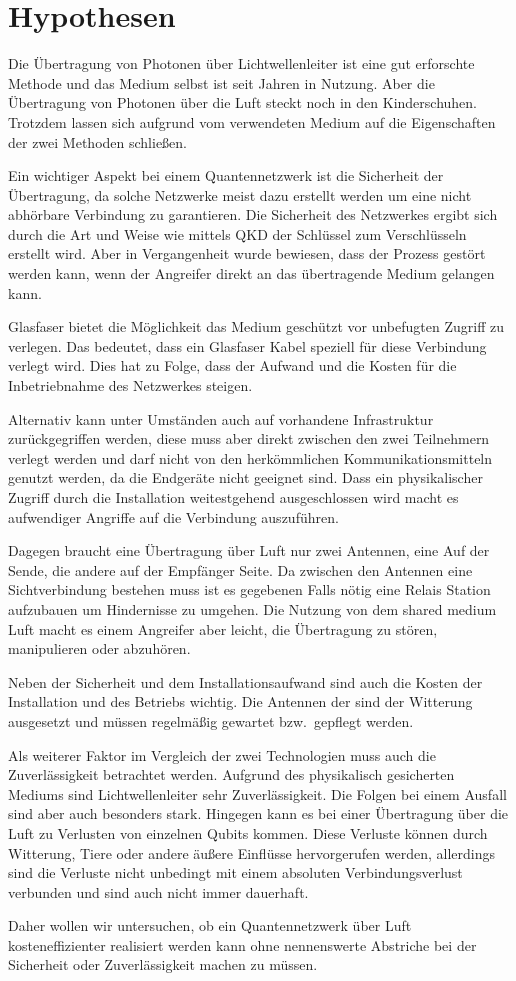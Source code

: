 \chapter{Hypothesen}

Die Übertragung von Photonen über Lichtwellenleiter ist eine gut erforschte Methode und das Medium selbst ist seit Jahren in Nutzung.
Aber die Übertragung von Photonen über die Luft steckt noch in den Kinderschuhen.
Trotzdem lassen sich aufgrund vom verwendeten Medium auf die Eigenschaften der zwei Methoden schließen.

Ein wichtiger Aspekt bei einem Quantennetzwerk ist die Sicherheit der Übertragung, da solche Netzwerke meist dazu erstellt werden um eine nicht abhörbare Verbindung zu garantieren.
Die Sicherheit des Netzwerkes ergibt sich durch die Art und Weise wie mittels \ac{QKD} der Schlüssel zum Verschlüsseln erstellt wird.
Aber in Vergangenheit wurde bewiesen, dass der Prozess gestört werden kann, wenn der Angreifer direkt an das übertragende Medium gelangen kann\cite{Fei2018QuantumMA}.

Glasfaser bietet die Möglichkeit das Medium geschützt vor unbefugten Zugriff zu verlegen.
Das bedeutet, dass ein Glasfaser Kabel speziell für diese Verbindung verlegt wird.
Dies hat zu Folge, dass der Aufwand und die Kosten für die Inbetriebnahme des Netzwerkes steigen.

Alternativ kann unter Umständen auch auf vorhandene Infrastruktur zurückgegriffen werden, diese muss aber direkt zwischen den zwei Teilnehmern verlegt werden und darf nicht von den herkömmlichen Kommunikationsmitteln genutzt werden, da die Endgeräte nicht geeignet sind.
Dass ein physikalischer Zugriff durch die Installation weitestgehend ausgeschlossen wird macht es aufwendiger Angriffe auf die Verbindung auszuführen.

Dagegen braucht eine Übertragung über Luft nur zwei Antennen, eine Auf der Sende, die andere auf der Empfänger Seite.
Da zwischen den Antennen eine Sichtverbindung bestehen muss ist es gegebenen Falls nötig eine Relais Station aufzubauen um Hindernisse zu umgehen.
Die Nutzung von dem shared medium Luft macht es einem Angreifer aber leicht, die Übertragung zu stören, manipulieren oder abzuhören.

Neben der Sicherheit und dem Installationsaufwand sind auch die Kosten der Installation und des Betriebs wichtig.
Die Antennen der sind der Witterung ausgesetzt und müssen regelmäßig gewartet bzw.~gepflegt werden.

Als weiterer Faktor im Vergleich der zwei Technologien muss auch die Zuverlässigkeit betrachtet werden.
Aufgrund des physikalisch gesicherten Mediums sind Lichtwellenleiter sehr Zuverlässigkeit.
Die Folgen bei einem Ausfall sind aber auch besonders stark.
Hingegen kann es bei einer Übertragung über die Luft zu Verlusten von einzelnen Qubits kommen.
Diese Verluste können durch Witterung, Tiere oder andere äußere Einflüsse hervorgerufen werden, allerdings sind die Verluste nicht unbedingt mit einem absoluten Verbindungsverlust verbunden und sind auch nicht immer dauerhaft.

Daher wollen wir untersuchen, ob ein Quantennetzwerk über Luft kosteneffizienter realisiert werden kann ohne nennenswerte Abstriche bei der Sicherheit oder Zuverlässigkeit machen zu müssen.

